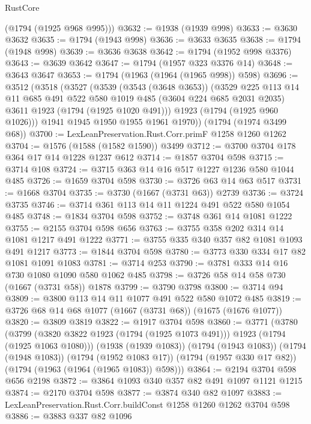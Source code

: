\begin{lexlean}{RustCore}
\begin{coremodule}
      (@1794 (@1925 @968 @995)))
@3632 := @1938 (@1939 @998)
@3633 := @3630 @3632
@3635 := @1794 (@1943 @998)
@3636 := @3633 @3635
@3638 := @1794 (@1948 @998)
@3639 := @3636 @3638
@3642 := @1794 (@1952 @998 @3376)
@3643 := @3639 @3642
@3647 := @1794 (@1957 @323 @3376 @14)
@3648 := @3643 @3647
@3653 := @1794 (@1963 (@1964 (@1965 @998)) @598)
@3696 := @3512
    (@3518
      (@3527
        (@3539
          (@3543 (@3648 @3653))
          (@3529
            @225
            @113
            @14
            @11
            @685
            @491
            @522
            @580
            @1019
            @485
            (@3604 @224 @685 @2031 @2035)
            @3611
            @1923
            (@1794 (@1925 @1020 @491)))
          @1923
          (@1794 (@1925 @960 @1026)))
        @1941
        @1945
        @1950
        @1955
        @1961
        @1970))
    (@1794 (@1974 @3499 @68))
@3700 := LexLeanPreservation.Rust.Corr.primF @1258 @1260 @1262
@3704 := @1576 (@1588 (@1582 @1590)) @3499
@3712 := @3700 @3704 @178 @364 @17 @14 @1228 @1237 @612
@3714 := @1857 @3704 @598
@3715 := @3714 @108
@3724 := @3715 @363 @14 @16 @517 @1227 @1236 @580 @1044 @485
@3726 := @1659 @3704 @598
@3730 := @3726 @63 @14 @63 @517
@3731 := @1668 @3704
@3735 := @3730 (@1667 (@3731 @63)) @2739
@3736 := @3724 @3735
@3746 := @3714 @361 @113 @14 @11 @1224 @491 @522 @580 @1054 @485
@3748 := @1834 @3704 @598
@3752 := @3748 @361 @14 @1081 @1222
@3755 := @2155 @3704 @598 @656
@3763 := @3755 @358 @202 @314 @14 @1081 @1217 @491 @1222
@3771 := @3755 @335 @340 @357 @82 @1081 @1093 @491 @1217
@3773 := @1844 @3704 @598
@3780 := @3773 @330 @334 @17 @82 @1081 @1091 @1083
@3781 := @3714 @253
@3790 := @3781 @333 @14 @16 @730 @1080 @1090 @580 @1062 @485
@3798 := @3726 @58 @14 @58 @730 (@1667 (@3731 @58)) @1878
@3799 := @3790 @3798
@3800 := @3714 @94
@3809 := @3800 @113 @14 @11 @1077 @491 @522 @580 @1072 @485
@3819 := @3726 @68 @14 @68 @1077 (@1667 (@3731 @68)) (@1675 (@1676 @1077))
@3820 := @3809 @3819
@3822 := @1917 @3704 @598
@3860 := @3771
    (@3780
      (@3799 (@3820 @3822 @1923 (@1794 (@1925 @1073 @491))) @1923 (@1794 (@1925 @1063 @1080)))
      (@1938 (@1939 @1083))
      (@1794 (@1943 @1083))
      (@1794 (@1948 @1083))
      (@1794 (@1952 @1083 @17))
      (@1794 (@1957 @330 @17 @82))
      (@1794 (@1963 (@1964 (@1965 @1083)) @598)))
@3864 := @2194 @3704 @598 @656 @2198
@3872 := @3864 @1093 @340 @357 @82 @491 @1097 @1121 @1215
@3874 := @2170 @3704 @598
@3877 := @3874 @340 @82 @1097
@3883 := LexLeanPreservation.Rust.Corr.buildConst @1258 @1260 @1262 @3704 @598
@3886 := @3883 @337 @82 @1096

\end{coremodule}
\end{lexlean}

